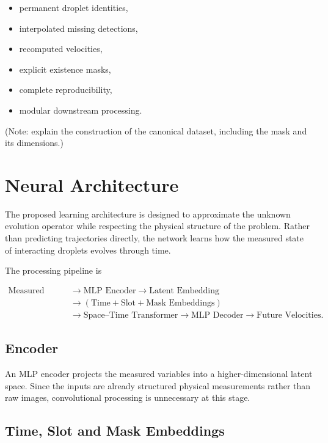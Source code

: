 \documentclass[11pt]{article}
\begin{document}
\begin{itemize}
\item permanent droplet identities,
\item interpolated missing detections,
\item recomputed velocities,
\item explicit existence masks,
\item complete reproducibility,
\item modular downstream processing.
\end{itemize}

(Note: explain the construction of the canonical dataset, including the mask
and its dimensions.)

\section{Neural Architecture}

The proposed learning architecture is designed to approximate the unknown evolution operator while respecting the physical structure of the problem. Rather than predicting trajectories directly, the network learns how the measured state of interacting droplets evolves through time.

The processing pipeline is

\[
\begin{aligned}
\text{Measured State}
&\rightarrow
\text{MLP Encoder}
\rightarrow
\text{Latent Embedding} \\
&\rightarrow
(\text{Time}+\text{Slot}+\text{Mask Embeddings}) \\
&\rightarrow
\text{Space--Time Transformer}
\rightarrow
\text{MLP Decoder}
\rightarrow
\text{Future Velocities}.
\end{aligned}
\]

\subsection*{Encoder}

An MLP encoder projects the measured variables into a higher-dimensional latent space. Since the inputs are already structured physical measurements rather than raw images, convolutional processing is unnecessary at this stage.

\subsection*{Time, Slot and Mask Embeddings}
\end{document}
